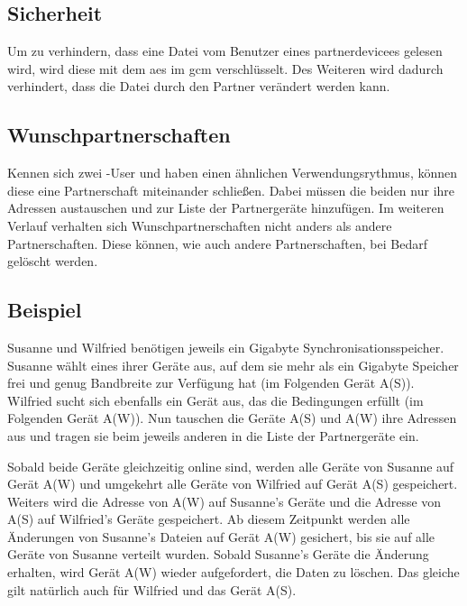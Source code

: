 \subsection{Sicherheit} \label{sicherheit}
Um zu verhindern, dass eine Datei vom Benutzer eines \gls{partnerdevice}es gelesen wird, wird diese mit dem \gls{aes} im \gls{gcm} verschlüsselt. Des Weiteren wird dadurch verhindert, dass die Datei durch den Partner verändert werden kann. 

\subsection{Wunschpartnerschaften}
Kennen sich zwei \sblit-User und haben einen ähnlichen Verwendungsrythmus, können diese eine Partnerschaft miteinander schließen. Dabei müssen die beiden nur ihre Adressen austauschen und zur Liste der Partnergeräte hinzufügen. Im weiteren Verlauf verhalten sich Wunschpartnerschaften nicht anders als andere Partnerschaften. Diese können, wie auch andere Partnerschaften, bei Bedarf gelöscht werden.

\subsection{Beispiel}
Susanne und Wilfried benötigen jeweils ein Gigabyte Synchronisationsspeicher. Susanne wählt eines ihrer Geräte aus, auf dem sie mehr als ein Gigabyte Speicher frei und genug Bandbreite zur Verfügung hat (im Folgenden Gerät A(S)). Wilfried sucht sich ebenfalls ein Gerät aus, das die Bedingungen erfüllt (im Folgenden Gerät A(W)). Nun tauschen die Geräte A(S) und A(W) ihre Adressen aus und tragen sie beim jeweils anderen in die Liste der Partnergeräte ein. 

Sobald beide Geräte gleichzeitig online sind, werden alle Geräte von Susanne auf Gerät A(W) und umgekehrt alle Geräte von Wilfried auf Gerät A(S) gespeichert. Weiters wird die Adresse von A(W) auf Susanne's Geräte und die Adresse von A(S) auf Wilfried's Geräte gespeichert. Ab diesem Zeitpunkt werden alle Änderungen von Susanne's Dateien auf Gerät A(W) gesichert, bis sie auf alle Geräte von Susanne verteilt wurden. Sobald Susanne's Geräte die Änderung erhalten, wird Gerät A(W) wieder aufgefordert, die Daten zu löschen. Das gleiche gilt natürlich auch für Wilfried und das Gerät A(S). 